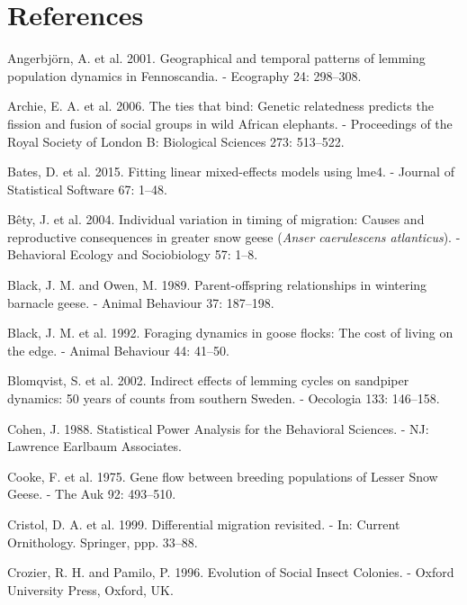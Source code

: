 \documentclass[10pt,twocolumn]{paper}
\begin{document}
\section{References}\label{references}

\small

\hypertarget{refs}{}
\hypertarget{ref-angerbjorn2001geographical}{}
Angerbjörn, A. et al. 2001. Geographical and temporal patterns of
lemming population dynamics in Fennoscandia. - Ecography 24: 298--308.

\hypertarget{ref-Archie513}{}
Archie, E. A. et al. 2006. The ties that bind: Genetic relatedness
predicts the fission and fusion of social groups in wild African
elephants. - Proceedings of the Royal Society of London B: Biological
Sciences 273: 513--522.

\hypertarget{ref-lme4}{}
Bates, D. et al. 2015. Fitting linear mixed-effects models using lme4. -
Journal of Statistical Software 67: 1--48.

\hypertarget{ref-Buxeaty2004}{}
Bêty, J. et al. 2004. Individual variation in timing of migration:
Causes and reproductive consequences in greater snow geese (\emph{Anser
caerulescens atlanticus}). - Behavioral Ecology and Sociobiology 57:
1--8.

\hypertarget{ref-black1989parent}{}
Black, J. M. and Owen, M. 1989. Parent-offspring relationships in
wintering barnacle geese. - Animal Behaviour 37: 187--198.

\hypertarget{ref-black1992foraging}{}
Black, J. M. et al. 1992. Foraging dynamics in goose flocks: The cost of
living on the edge. - Animal Behaviour 44: 41--50.

\hypertarget{ref-blomqvist2002indirect}{}
Blomqvist, S. et al. 2002. Indirect effects of lemming cycles on
sandpiper dynamics: 50 years of counts from southern Sweden. - Oecologia
133: 146--158.

\hypertarget{ref-cohen1988statistical}{}
Cohen, J. 1988. Statistical Power Analysis for the Behavioral Sciences.
- NJ: Lawrence Earlbaum Associates.

\hypertarget{ref-cooke1975gene}{}
Cooke, F. et al. 1975. Gene flow between breeding populations of Lesser
Snow Geese. - The Auk 92: 493--510.

\hypertarget{ref-cristol1999differential}{}
Cristol, D. A. et al. 1999. Differential migration revisited. - In:
Current Ornithology. Springer, ppp. 33--88.

\hypertarget{ref-crozier1996evolution}{}
Crozier, R. H. and Pamilo, P. 1996. Evolution of Social Insect Colonies.
- Oxford University Press, Oxford, UK.
\end{document}
